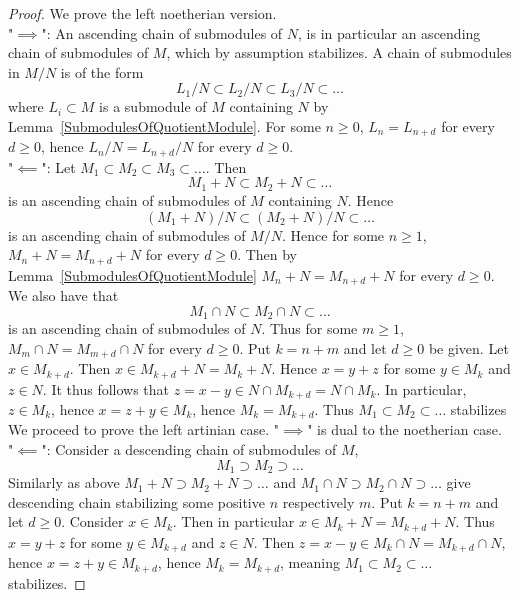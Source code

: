 \begin{proof}
    We prove the left noetherian version.\\
    "$\implies$": An ascending chain of submodules of $N$, is in particular an ascending chain of submodules of $M$, which by assumption stabilizes. A chain of submodules in $M/N$ is of the form 
    $$L_1/N\subset L_2/N\subset L_3/N \subset\dots$$
    where $L_i\subset M$ is a submodule of $M$ containing $N$ by Lemma~\ref{SubmodulesOfQuotientModule}. For some $n\geq 0$, $L_n = L_{n+d}$ for every $d\geq 0$, hence $L_n/N = L_{n+d}/N$ for every $d\geq 0$.\\
    "$\impliedby$": Let $M_1\subset M_2\subset M_3\subset \dots $. Then 
    $$M_1+N\subset M_2 + N\subset \dots $$
    is an ascending chain of submodules of $M$ containing $N$. Hence 
    $$(M_1+N)/N \subset (M_2+N)/N \subset \dots$$
    is an ascending chain of submodules of $M/N$. Hence for some $n\geq 1$, $M_{n}+N=M_{n+d}+N$ for every $d\geq 0$. Then by Lemma~\ref{SubmodulesOfQuotientModule} $M_n+N =M_{n+d} +N$ for every $d\geq 0$. We also have that 
    $$M_1\cap N \subset M_2\cap N\subset \dots$$
    is an ascending chain of submodules of $N$. Thus for some $m\geq 1$, $M_m \cap N = M_{m+d} \cap N$ for every $d\geq 0$. Put $k = n+m$ and let $d\geq 0$ be given. Let $x\in M_{k+d}$. Then $x \in M_{k+d}+N = M_k+N$. Hence $x = y+z$ for some $y\in M_k$ and $z \in N$. It thus follows that $z = x-y \in N\cap M_{k+d} = N \cap M_k$. In particular, $z \in M_k$, hence $x = z+y \in M_k$, hence $M_k = M_{k+d}$. Thus $M_1\subset M_2\subset \dots$ stabilizes\\
    We proceed to prove the left artinian case. "$\implies$" is dual to the noetherian case.\\
    "$\impliedby$": Consider a descending chain of submodules of $M$,
    $$M_1\supset M_2\supset\dots $$
    Similarly as above $M_1+N\supset M_2+N \supset \dots$ and $M_1\cap N \supset M_2\cap N\supset \dots$ give descending chain stabilizing some positive $n$ respectively $m$. Put $k=n+m$ and let $d\geq 0$. Consider $x\in M_k$. Then in particular $x \in M_k + N = M_{k+d} + N$. Thus $x = y+z$ for some $y\in M_{k+d}$ and $z\in N$. Then $z = x-y \in M_k \cap N =M_{k+d}\cap N$, hence $x =z+y \in M_{k+d}$, hence $M_k = M_{k+d}$, meaning $M_1\subset M_2\subset \dots$ stabilizes. 
\end{proof}
